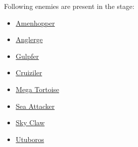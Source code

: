 Following enemies are present in the stage\cite{wiki:Ocean}:
\begin{itemize}
	\item \hyperlink{enem:Amenhopper}{Amenhopper}
	\item \hyperlink{miniboss:Anglerge}{Anglerge}
	\item \hyperlink{enem:Gulpfer}{Gulpfer }
	\item \hyperlink{enem:Cruiziler}{Cruiziler}
	\item \hyperlink{enem:Mega_Tortoise}{Mega Tortoise }
	\item \hyperlink{enem:Sea_Attacker}{Sea Attacker}
	\item \hyperlink{enem:Sky_Claw}{Sky Claw }
	\item \hyperlink{miniboss:Utuboros}{Utuboros}
\end{itemize}

